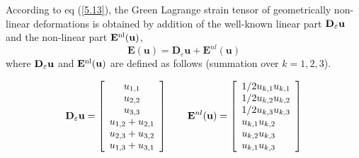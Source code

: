 According to eq (\ref{5.13}), the Green Lagrange strain tensor of geometrically non-linear
deformations is obtained by addition of the well-known linear part ${\bf D}_\varepsilon \bf u$ and the non-linear part $\bf E^\textnormal{nl}(u)$,
\begin{equation}
 \boldsymbol{E}(\boldsymbol{u})=\mathbf{D}_{\varepsilon} \boldsymbol{u}+\boldsymbol{E}^{n l}(\boldsymbol{u}) 
\end{equation}
where  ${\bf D}_\varepsilon \bf u$ and $\bf E^\textnormal{nl}(u)$ are defined as follows (summation over $k = 1, 2, 3$).

\begin{equation}
    {{\bf{D}}_\varepsilon }{\bf{u}} = \left[ {\begin{array}{*{20}{c}}
{{u_{1,1}}}\\
{{u_{2,2}}}\\
{{u_{3,3}}}\\
{{u_{1,2}} + {u_{2,1}}}\\
{{u_{2,3}} + {u_{3,2}}}\\
{{u_{1,3}} + {u_{3,1}}}
\end{array}} \right]\qquad {{\bf{E}}^{nl}}({\bf{u}}) = \left[ {\begin{array}{*{20}{l}}
{1/2}{{u_{k,1}}}{{u_{k,1}}}\\
{1/2}{{u_{k,2}}}{{u_{k,2}}}\\
{1/2}{{u_{k,3}}}{{u_{k,3}}}\\
{{u_{k,1}}}{{u_{k,2}}}{}\\
{{u_{k,2}}}{{u_{k,3}}}{}\\
{{u_{k,1}}}{{u_{k,3}}}{}
\end{array}} \right]
\end{equation}
